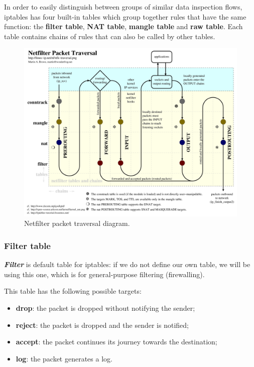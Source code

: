 In order to easily distinguish between groups of similar data inspection flows, iptables has four built-in tables which group together rules that have the same function: the \textbf{filter table}, \textbf{NAT table}, \textbf{mangle table} and \textbf{raw table}. Each table contains chains of rules that can also be called by other tables.

\begin{figure}[h]
    \centering
    \includegraphics[scale=0.6]{img/netfilter_packet_traversal.png}
    \decoRule
    \caption{Netfilter packet traversal diagram.}
    \label{fig:netfilter_packet_traversal}
\end{figure}


\subsubsection{Filter table}

\textit{\textbf{Filter}} is default table for iptables: if we do not define our own table, we will be using this one, which is for general-purpose filtering (firewalling).

This table has the following possible targets:

\begin{itemize}
    \item \textbf{drop}: the packet is dropped without notifying the sender;
    \item \textbf{reject}: the packet is dropped and the sender is notified;
    \item \textbf{accept}: the packet continues its journey towards the destination;
    \item \textbf{log}: the packet generates a log.
\end{itemize}

